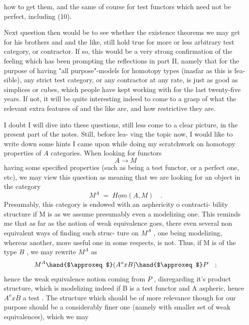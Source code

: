 
how to get them, and the same of course for test functors which need not
be perfect, including (10).

Next question then would be to see whether the existence theorems
we may get for \hand{$\Delta$}\hand{,}  his brothers \hand{$\square$} and \hand{\unsure{$\bigcirc$}} and the like, still hold
true for more or less arbitrary test category, or contractor. If so,
this would be a very strong confirmation of the feeling which has been
prompting the reflections in part II, namely that for the purpose of
having "all purpose"-models for homotopy types (inasfar as this is fea-%
sible), any strict test category, or any contractor at any rate, is
just as good as simplices or cubes, which people have kept working with
for the last twenty-five years. If not, it will be quite interesting
indeed to come to a grasp of what the relevant extra features of \hand{$\Delta$} and
the like are, and how restrictive they are.

I doubt I will dive into these questions, still less come to a
clear picture, in the present part of the notes. Still, before lea-%
ving the topic now, I would like to write down some hints\deleted{\unsure{,}} I came
upon while doing my scratchwork on homotopy properties of $A\hat{}$ categories.
When looking for functors
\[ A \longrightarrow M \]
having some specified properties (such as being a test functor, or a
perfect one, etc), we may view this question as meaning that we are
looking for an object  in the category
\[ M^A \;=\; \underline{Hom}(A,M) \quad . \]
Presumably, this category is endowed with an asphericity o contracti-%
bility structure if M is\deleted{,} \hand{(}as we assume\hand{)}\hand{,} presumably even a modelizing
one. This reminds me that as far as the notion of weak equivalence
goes, there  even several non equivalent ways of finding such struc-%
ture on $M^A$ , one being modelizing, whereas another, more useful one
in some respects, is not. Thus, if M is of the type $B\hat{}$ , we may
rewrite $M^A$ as
\[ M^A \hand{$\approxeq$} (A^{o}xB)\hat{} \hand{$\approxeq$} P\hat{} \quad ; \]
hence  the weak equivalence notion coming from $P\hat{}$ , disregarding it's
product structure, which is modelizing indeed if B is a test functor
and A aspheric, hence $A^{o}xB$ a test . The structure which should
be of more relevance though for our purpose should be a considerably
finer one (namely with smaller set of weak equivalences), which we may

